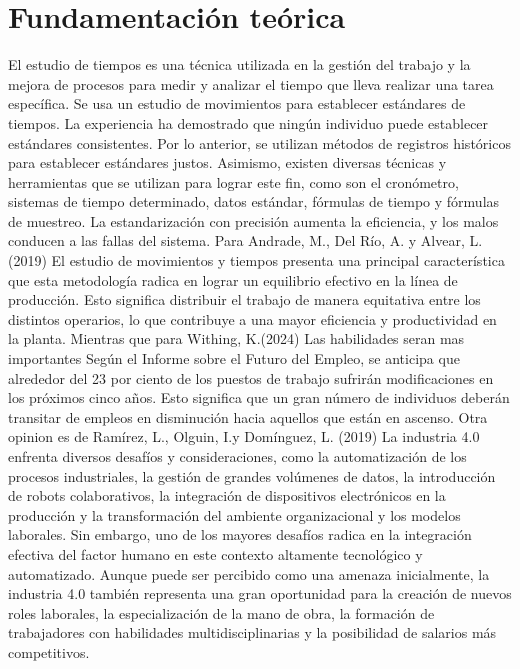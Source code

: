     \section{Fundamentación teórica}
    El estudio de tiempos es una técnica utilizada en la gestión del
    trabajo y la mejora de procesos para medir y analizar el tiempo que
    lleva realizar una tarea específica. Se usa un estudio de movimientos
    para establecer estándares de tiempos. La experiencia ha demostrado
    que ningún individuo puede establecer estándares consistentes.
    Por lo anterior, se utilizan métodos de registros históricos para
    establecer estándares justos. Asimismo, existen diversas técnicas y
    herramientas que se utilizan para lograr este fin, como son el
    cronómetro, sistemas de tiempo determinado, datos estándar,
    fórmulas de tiempo y fórmulas de muestreo. La estandarización con
    precisión aumenta la eficiencia, y los malos conducen a las fallas del
    sistema.
    Para Andrade, M., Del Río, A. y Alvear, L.(2019) El estudio de movimientos y tiempos presenta una principal característica que esta metodología radica en lograr un equilibrio efectivo en la línea de producción. Esto significa distribuir el trabajo de manera equitativa entre los distintos operarios, lo que contribuye a una mayor eficiencia y productividad en la planta.
    Mientras que para Withing, K.(2024) 
    Las habilidades seran mas importantes Según el Informe sobre el Futuro del Empleo, se anticipa que alrededor del 23 por ciento de los puestos de trabajo sufrirán modificaciones en los próximos cinco años. Esto significa que un gran número de individuos deberán transitar de empleos en disminución hacia aquellos que están en ascenso.
    Otra opinion es de Ramírez, L., Olguin, I.y Domínguez, L. (2019) La industria 4.0 enfrenta diversos desafíos y consideraciones, como la automatización de los procesos industriales, la gestión de grandes volúmenes de datos, la introducción de robots colaborativos, la integración de dispositivos electrónicos en la producción y la transformación del ambiente organizacional y los modelos laborales. Sin embargo, uno de los mayores desafíos radica en la integración efectiva del factor humano en este contexto altamente tecnológico y automatizado. Aunque puede ser percibido como una amenaza inicialmente, la industria 4.0 también representa una gran oportunidad para la creación de nuevos roles laborales, la especialización de la mano de obra, la formación de trabajadores con habilidades multidisciplinarias y la posibilidad de salarios más competitivos.
    
